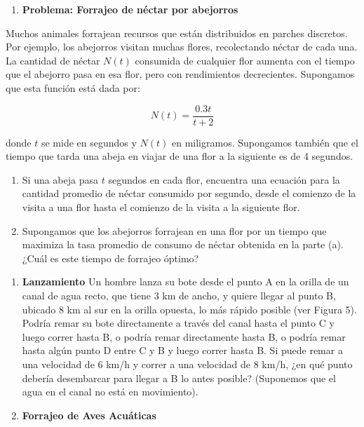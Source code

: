 \documentclass[
]{article}
\providecommand{\tightlist}{%
  \setlength{\itemsep}{0pt}\setlength{\parskip}{0pt}}\usepackage{longtable,booktabs,array}
\begin{document}
\begin{enumerate}
\def\labelenumi{\arabic{enumi}.}
\setcounter{enumi}{5}
\tightlist
\item
  \textbf{Problema: Forrajeo de néctar por abejorros}
\end{enumerate}

Muchos animales forrajean recursos que están distribuidos en parches
discretos. Por ejemplo, los abejorros visitan muchas flores,
recolectando néctar de cada una. La cantidad de néctar \(N(t)\)
consumida de cualquier flor aumenta con el tiempo que el abejorro pasa
en esa flor, pero con rendimientos decrecientes. Supongamos que esta
función está dada por:

\[
N(t) = \frac{0.3t}{t+2}
\]

donde \(t\) se mide en segundos y \(N(t)\) en miligramos. Supongamos
también que el tiempo que tarda una abeja en viajar de una flor a la
siguiente es de 4 segundos.

\begin{enumerate}
\def\labelenumi{\alph{enumi}.}
\item
  Si una abeja pasa \(t\) segundos en cada flor, encuentra una ecuación
  para la cantidad promedio de néctar consumido por segundo, desde el
  comienzo de la visita a una flor hasta el comienzo de la visita a la
  siguiente flor.
\item
  Supongamos que los abejorros forrajean en una flor por un tiempo que
  maximiza la tasa promedio de consumo de néctar obtenida en la parte
  (a). ¿Cuál es este tiempo de forrajeo óptimo?
\end{enumerate}

\begin{enumerate}
\def\labelenumi{\arabic{enumi}.}
\setcounter{enumi}{6}
\item
  \textbf{Lanzamiento} Un hombre lanza su bote desde el punto A en la
  orilla de un canal de agua recto, que tiene 3 km de ancho, y quiere
  llegar al punto B, ubicado 8 km al sur en la orilla opuesta, lo más
  rápido posible (ver Figura 5). Podría remar su bote directamente a
  través del canal hasta el punto C y luego correr hasta B, o podría
  remar directamente hasta B, o podría remar hasta algún punto D entre C
  y B y luego correr hasta B. Si puede remar a una velocidad de 6 km/h y
  correr a una velocidad de 8 km/h, ¿en qué punto debería desembarcar
  para llegar a B lo antes posible? (Suponemos que el agua en el canal
  no está en movimiento).
\item
  \textbf{Forrajeo de Aves Acuáticas}
\end{enumerate}
\end{document}
